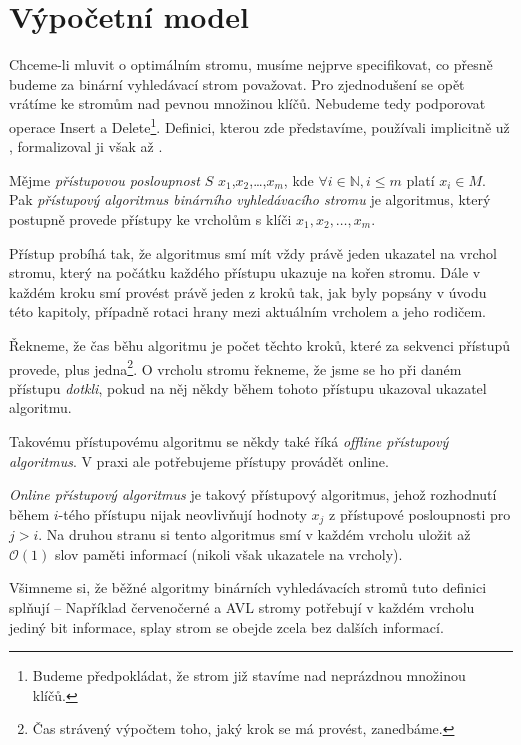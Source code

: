 \section{Výpočetní model}
Chceme-li mluvit o optimálním stromu, musíme nejprve specifikovat, co přesně
budeme za binární vyhledávací strom považovat. Pro zjednodušení se opět vrátíme
ke stromům nad pevnou množinou klíčů. Nebudeme tedy podporovat operace Insert a Delete\footnote{Budeme předpokládat, že strom již stavíme nad neprázdnou množinou klíčů.}.
Definici, kterou zde
představíme, používali implicitně už \citet{splay}, formalizoval ji však až
\citet{tango}.


\begin{definice}
Mějme \emph{přístupovou posloupnost} $S$ $x_1$,$x_2$,\dots,$x_m$, kde $\forall i \in
\mathbb N, i\leq m$ platí $x_i\in M$. Pak \emph{přístupový algoritmus
binárního vyhledávacího stromu} je algoritmus, který postupně provede přístupy
ke vrcholům s klíči $x_1, x_2,\dots,x_m$.

Přístup probíhá tak, že algoritmus smí mít vždy právě jeden ukazatel na vrchol
stromu, který na počátku každého přístupu ukazuje na kořen stromu. Dále v
každém kroku smí provést právě jeden z kroků tak, jak byly popsány v úvodu této kapitoly, případně rotaci hrany mezi aktuálním vrcholem a jeho rodičem. 

Řekneme, že čas běhu algoritmu je počet těchto kroků, které za sekvenci
přístupů provede, plus jedna\footnote{Čas strávený výpočtem toho, jaký krok se má provést, zanedbáme.}. O vrcholu stromu řekneme, že jsme se ho při daném
přístupu \emph{dotkli}, pokud na něj někdy během tohoto přístupu ukazoval
ukazatel algoritmu.  \end{definice}

Takovému přístupovému algoritmu se někdy také říká \emph{offline přístupový
algoritmus}. V praxi ale potřebujeme přístupy provádět online.

\begin{definice}
\emph{Online přístupový algoritmus} je takový přístupový algoritmus, jehož
rozhodnutí během $i$-tého přístupu nijak neovlivňují hodnoty $x_j$ z přístupové
posloupnosti pro $j>i$. Na druhou stranu si tento algoritmus smí v každém
vrcholu uložit až $\mathcal O(1)$ slov paměti informací (nikoli však ukazatele
na vrcholy).
\end{definice}

Všimneme si, že běžné algoritmy binárních vyhledávacích stromů tuto definici
splňují -- Například červenočerné a AVL stromy potřebují v každém vrcholu
jediný bit informace, splay strom se obejde zcela bez dalších informací.


